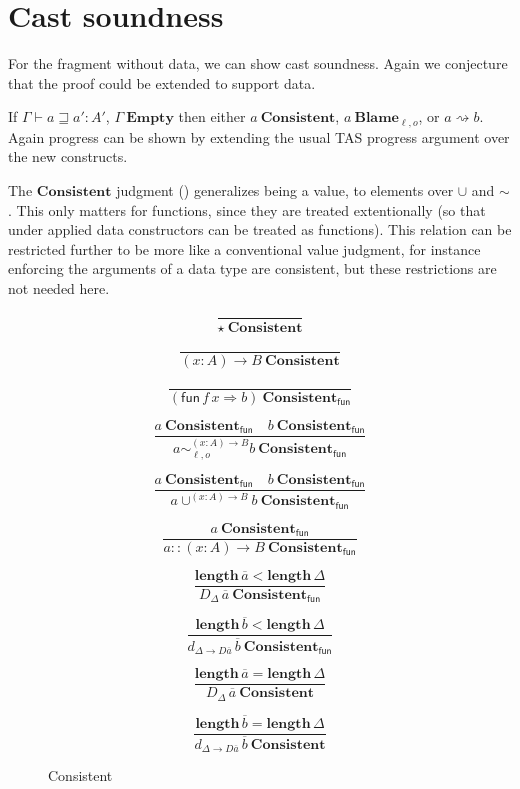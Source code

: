 \section{Cast soundness}

For the fragment without data, we can show cast soundness.
Again we conjecture that the proof could be extended to support data.
 
If $\varGamma\vdash a\sqsupseteq a':A'$, $\varGamma\ \mathbf{Empty}$ then either $a\ \mathbf{Consistent}$, $a\ \mathbf{Blame}_{\ell,o}$, or $a\rightsquigarrow b$.
Again progress can be shown by extending the usual \ac{TAS} progress argument over the new constructs.

The $\mathbf{Consistent}$ judgment () generalizes being a value, to elements over $\cup$ and $\sim$.
This only matters for functions, since they are treated extentionally (so that under applied data constructors can be treated as functions).
This relation can be restricted further to be more like a conventional value judgment, for instance enforcing the arguments of a data type are consistent, but these restrictions are not needed here.

\begin{figure}
\[
\frac{\ }{\star\ \mathbf{Consistent}}
\]

\[
\frac{\ }{\left(x:A\right)\rightarrow B\ \mathbf{Consistent}}
\]

\[
\frac{\ }{\left(\mathsf{fun}\,f\,x\Rightarrow b\right)\ \mathbf{Consistent_{\mathsf{fun}}}}
\]

\[
\frac{
  a\ \mathbf{Consistent_{\mathsf{fun}}}\quad b\ \mathbf{Consistent_{\mathsf{fun}}}
}{
  a\sim_{\ell,o}^{\left(x:A\right)\rightarrow B}b\ \mathbf{Consistent_{\mathsf{fun}}}}
\]

\[
\frac{
  a\ \mathbf{Consistent_{\mathsf{fun}}}\quad b\ \mathbf{Consistent_{\mathsf{fun}}}
}{
  a\cup^{\left(x:A\right)\rightarrow B}b\ \mathbf{Consistent_{\mathsf{fun}}}
}
\]

\[
\frac{
  a\ \mathbf{Consistent_{\mathsf{fun}}}
}{
  a::\left(x:A\right)\rightarrow B\ \mathbf{Consistent_{\mathsf{fun}}}}
\]

\[
\frac{
  \mathbf{length}\,\overline{a} < \mathbf{length}\,\Delta
}{
  D_{\Delta}\,\overline{a}\ \mathbf{Consistent_{\mathsf{fun}}}
}
\]

\[
\frac{
  \mathbf{length}\,\overline{b} < \mathbf{length}\,\Delta
}{
  d_{\Delta\rightarrow D\overline{a}}\,\overline{b}\ \mathbf{Consistent_{\mathsf{fun}}}
}
\]

\[
\frac{
  \mathbf{length}\,\overline{a} = \mathbf{length}\,\Delta
}{
  D_{\Delta}\,\overline{a}\ \mathbf{Consistent}
}
\]

\[
\frac{
  \mathbf{length}\,\overline{b} = \mathbf{length}\,\Delta
}{
  d_{\Delta\rightarrow D\overline{a}}\,\overline{b}\ \mathbf{Consistent}
}
\]

\caption{Consistent}
\label{fig:cast-data-val}
\end{figure}


